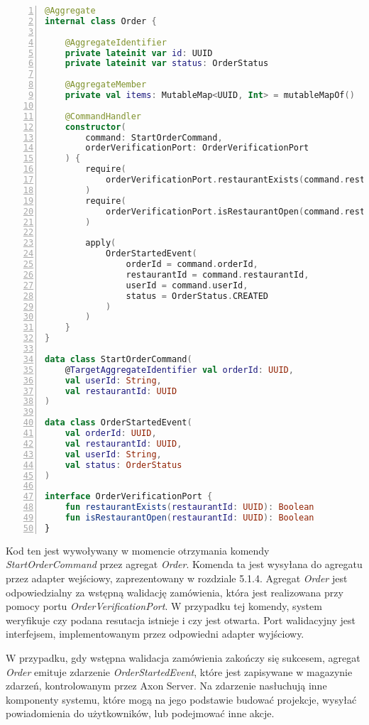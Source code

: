 \begin{lstlisting}[caption={Kod komponentów odpowiedzialnych za rozpoczynanie zamówień},label={lst:server-domain},captionpos=b,language=Kotlin,numbers=left]
@Aggregate
internal class Order {

    @AggregateIdentifier
    private lateinit var id: UUID
    private lateinit var status: OrderStatus

    @AggregateMember
    private val items: MutableMap<UUID, Int> = mutableMapOf()

    @CommandHandler
    constructor(
        command: StartOrderCommand,
        orderVerificationPort: OrderVerificationPort
    ) {
        require(
            orderVerificationPort.restaurantExists(command.restaurantId)
        )
        require(
            orderVerificationPort.isRestaurantOpen(command.restaurantId)
        )

        apply(
            OrderStartedEvent(
                orderId = command.orderId,
                restaurantId = command.restaurantId,
                userId = command.userId,
                status = OrderStatus.CREATED
            )
        )
    }
}

data class StartOrderCommand(
    @TargetAggregateIdentifier val orderId: UUID,
    val userId: String,
    val restaurantId: UUID
)

data class OrderStartedEvent(
    val orderId: UUID,
    val restaurantId: UUID,
    val userId: String,
    val status: OrderStatus
)

interface OrderVerificationPort {
    fun restaurantExists(restaurantId: UUID): Boolean
    fun isRestaurantOpen(restaurantId: UUID): Boolean
}
\end{lstlisting}

Kod ten jest wywoływany w momencie otrzymania komendy \textit{StartOrderCommand} przez agregat \textit{Order}. Komenda ta jest wysyłana do agregatu przez adapter wejściowy, zaprezentowany w rozdziale 5.1.4. Agregat \textit{Order} jest odpowiedzialny za wstępną walidację zamówienia, która jest realizowana przy pomocy portu \textit{OrderVerificationPort}. W przypadku tej komendy, system weryfikuje czy podana resutacja istnieje i czy jest otwarta. Port walidacyjny jest interfejsem, implementowanym przez odpowiedni adapter wyjściowy.

W przypadku, gdy wstępna walidacja zamówienia zakończy się sukcesem, agregat \textit{Order} emituje zdarzenie \textit{OrderStartedEvent}, które jest zapisywane w magazynie zdarzeń, kontrolowanym przez Axon Server. Na zdarzenie nasłuchują inne komponenty systemu, które mogą na jego podstawie budować projekcje, wysyłać powiadomienia do użytkowników, lub podejmować inne akcje.


